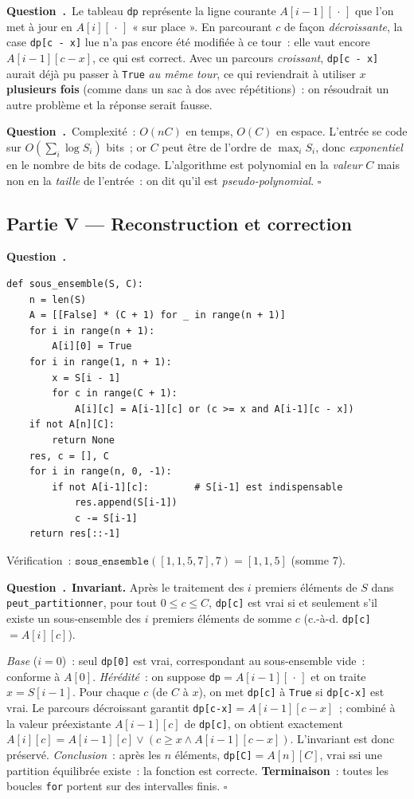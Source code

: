 \documentclass[11pt,a4paper]{article}
\newcounter{qcnt}
\newcommand{\Q}{\medskip\par\stepcounter{qcnt}\noindent\textbf{Question~\theqcnt.}~}
\newcommand{\code}[1]{\lstinline!#1!}
\begin{document}
\Q Le tableau \code{dp} représente la ligne courante $A[i-1][\,\cdot\,]$ que l'on met à jour en
$A[i][\,\cdot\,]$ « sur place ». En parcourant $c$ de façon \emph{décroissante}, la case
\code{dp[c - x]} lue n'a pas encore été modifiée à ce tour~: elle vaut encore $A[i-1][c-x]$, ce
qui est correct. Avec un parcours \emph{croissant}, \code{dp[c - x]} aurait déjà pu passer à
\code{True} \emph{au même tour}, ce qui reviendrait à utiliser $x$ \textbf{plusieurs fois} (comme
dans un sac à dos avec répétitions)~: on résoudrait un autre problème et la réponse serait fausse.

\Q Complexité~: $O(nC)$ en temps, $O(C)$ en espace. L'entrée se code sur $O\!\left(\sum_i
\log S_i\right)$ bits~; or $C$ peut être de l'ordre de $\max_i S_i$, donc \emph{exponentiel} en le
nombre de bits de codage. L'algorithme est polynomial en la \emph{valeur} $C$ mais non en la
\emph{taille} de l'entrée~: on dit qu'il est \emph{pseudo-polynomial}. $\square$

\subsection*{Partie V --- Reconstruction et correction}

\Q
\begin{lstlisting}
def sous_ensemble(S, C):
    n = len(S)
    A = [[False] * (C + 1) for _ in range(n + 1)]
    for i in range(n + 1):
        A[i][0] = True
    for i in range(1, n + 1):
        x = S[i - 1]
        for c in range(C + 1):
            A[i][c] = A[i-1][c] or (c >= x and A[i-1][c - x])
    if not A[n][C]:
        return None
    res, c = [], C
    for i in range(n, 0, -1):
        if not A[i-1][c]:        # S[i-1] est indispensable
            res.append(S[i-1])
            c -= S[i-1]
    return res[::-1]
\end{lstlisting}
Vérification~: $\mathtt{sous\_ensemble}([1,1,5,7],7) = [1,1,5]$ (somme $7$).

\Q \textbf{Invariant.} Après le traitement des $i$ premiers éléments de $S$ dans
\code{peut_partitionner}, pour tout $0\le c\le C$, \code{dp[c]} est vrai si et seulement s'il
existe un sous-ensemble des $i$ premiers éléments de somme $c$ (c.-à-d. \code{dp[c]}$=A[i][c]$).

\noindent\emph{Base} ($i=0$)~: seul \code{dp[0]} est vrai, correspondant au sous-ensemble vide~:
conforme à $A[0]$. \emph{Hérédité}~: on suppose \code{dp}$=A[i-1][\,\cdot\,]$ et on traite
$x=S[i-1]$. Pour chaque $c$ (de $C$ à $x$), on met \code{dp[c]} à \code{True} si \code{dp[c-x]}
est vrai. Le parcours décroissant garantit \code{dp[c-x]}$=A[i-1][c-x]$~; combiné à la valeur
préexistante $A[i-1][c]$ de \code{dp[c]}, on obtient exactement $A[i][c]=A[i-1][c]\lor(c\ge x\land
A[i-1][c-x])$. L'invariant est donc préservé. \emph{Conclusion}~: après les $n$ éléments,
\code{dp[C]}$=A[n][C]$, vrai ssi une partition équilibrée existe~: la fonction est correcte.
\textbf{Terminaison}~: toutes les boucles \code{for} portent sur des intervalles finis. $\square$
\end{document}
